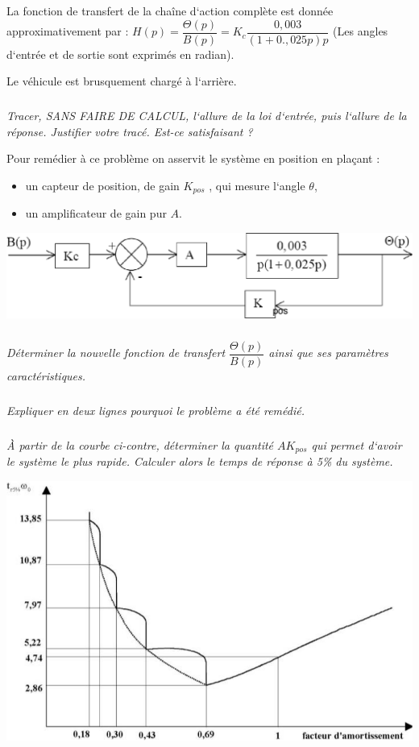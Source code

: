 \documentclass[11pt,oneside]{article}
\begin{document}
La fonction de transfert de la chaîne d‘action complète est donnée
approximativement par :
$H(p)=\dfrac{\Theta(p)}{B(p)}=K_c\dfrac{0,003}{\left(1+0.,025p \right)p}$    
(Les angles d‘entrée et de sortie sont exprimés en radian).

Le véhicule est brusquement chargé à l‘arrière.

\subparagraph{}
\textit{Tracer, SANS FAIRE DE CALCUL, l‘allure de la loi d‘entrée, puis l‘allure
de la réponse.
Justifier votre tracé. Est-ce satisfaisant ?
}

Pour remédier à ce problème on asservit le système en position en plaçant :
\begin{itemize}
 \item un capteur de position, de gain $K_{pos}$ , qui mesure l‘angle $\theta$,
\item un amplificateur de gain pur $A$.
\end{itemize}

\begin{center}
 \includegraphics[width=.6\textwidth]{png/image6}
\end{center}

\subparagraph{}
\textit{Déterminer la nouvelle fonction de transfert $\dfrac{\Theta(p)}{B(p)}$
ainsi que ses paramètres caractéristiques.
}

\subparagraph{}
\textit{Expliquer en deux lignes pourquoi le problème a été remédié.}

\subparagraph{}
\textit{À partir de la courbe ci-contre, déterminer la quantité $AK_{pos}$ qui
permet d‘avoir le système le plus rapide. Calculer alors le temps de réponse à
5\% du système.}

\begin{center}
 \includegraphics[width=.6\textwidth]{png/image7}
\end{center}
\end{document}

